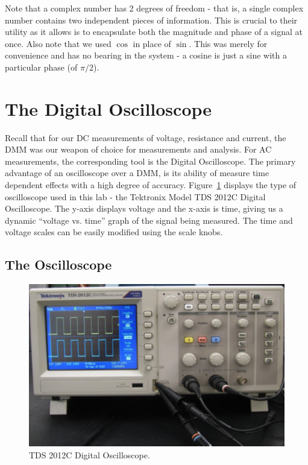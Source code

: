 \documentclass{tufte-book}
\begin{document}
Note that a complex number has 2 degrees of freedom - that is, a single complex number contains two independent pieces of information. This is crucial to their utility as it allows is to encapsulate both the magnitude and phase of a signal at once. Also note that we used $\cos$ in place of $\sin$. This was merely for convenience and has no bearing in the system - a cosine is just a sine with a particular phase (of $\pi/2$).

\section{The Digital Oscilloscope}
Recall that for our DC measurements of voltage, resistance and current, the DMM was our weapon of choice for measurements and analysis. For AC measurements, the corresponding tool is the Digital Oscilloscope.
The primary advantage of an oscilloscope over a DMM, is its ability of measure time dependent effects with a high degree of accuracy. 
Figure~\ref{fig:TDS2012C} displays the type of oscilloscope used in this lab - the Tektronix Model TDS 2012C Digital Oscilloscope. 
The y-axis displays voltage and the x-axis is time, giving us a dynamic “voltage vs. time” graph of the signal being measured. 
The time and voltage scales can be easily modified using the scale knobs. 

\subsection*{The Oscilloscope}
\begin{figure}[h]
\caption{TDS 2012C Digital Oscilloscope.}
\label{fig:TDS2012C}
\begin{center}
\includegraphics[width=\textwidth]{TDS_scope}
\end{center}
\end{figure}
\end{document}
